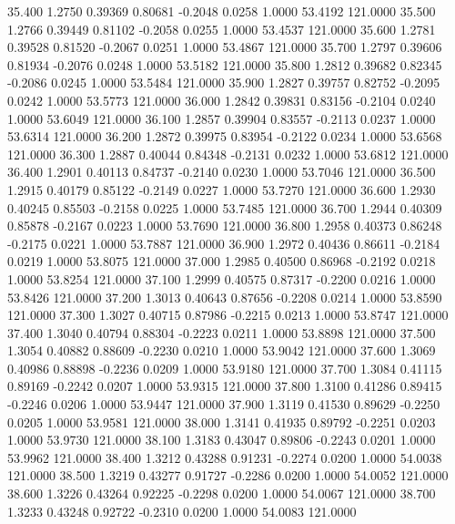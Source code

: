   35.400   1.2750   0.39369   0.80681  -0.2048   0.0258   1.0000  53.4192 121.0000
  35.500   1.2766   0.39449   0.81102  -0.2058   0.0255   1.0000  53.4537 121.0000
  35.600   1.2781   0.39528   0.81520  -0.2067   0.0251   1.0000  53.4867 121.0000
  35.700   1.2797   0.39606   0.81934  -0.2076   0.0248   1.0000  53.5182 121.0000
  35.800   1.2812   0.39682   0.82345  -0.2086   0.0245   1.0000  53.5484 121.0000
  35.900   1.2827   0.39757   0.82752  -0.2095   0.0242   1.0000  53.5773 121.0000
  36.000   1.2842   0.39831   0.83156  -0.2104   0.0240   1.0000  53.6049 121.0000
  36.100   1.2857   0.39904   0.83557  -0.2113   0.0237   1.0000  53.6314 121.0000
  36.200   1.2872   0.39975   0.83954  -0.2122   0.0234   1.0000  53.6568 121.0000
  36.300   1.2887   0.40044   0.84348  -0.2131   0.0232   1.0000  53.6812 121.0000
  36.400   1.2901   0.40113   0.84737  -0.2140   0.0230   1.0000  53.7046 121.0000
  36.500   1.2915   0.40179   0.85122  -0.2149   0.0227   1.0000  53.7270 121.0000
  36.600   1.2930   0.40245   0.85503  -0.2158   0.0225   1.0000  53.7485 121.0000
  36.700   1.2944   0.40309   0.85878  -0.2167   0.0223   1.0000  53.7690 121.0000
  36.800   1.2958   0.40373   0.86248  -0.2175   0.0221   1.0000  53.7887 121.0000
  36.900   1.2972   0.40436   0.86611  -0.2184   0.0219   1.0000  53.8075 121.0000
  37.000   1.2985   0.40500   0.86968  -0.2192   0.0218   1.0000  53.8254 121.0000
  37.100   1.2999   0.40575   0.87317  -0.2200   0.0216   1.0000  53.8426 121.0000
  37.200   1.3013   0.40643   0.87656  -0.2208   0.0214   1.0000  53.8590 121.0000
  37.300   1.3027   0.40715   0.87986  -0.2215   0.0213   1.0000  53.8747 121.0000
  37.400   1.3040   0.40794   0.88304  -0.2223   0.0211   1.0000  53.8898 121.0000
  37.500   1.3054   0.40882   0.88609  -0.2230   0.0210   1.0000  53.9042 121.0000
  37.600   1.3069   0.40986   0.88898  -0.2236   0.0209   1.0000  53.9180 121.0000
  37.700   1.3084   0.41115   0.89169  -0.2242   0.0207   1.0000  53.9315 121.0000
  37.800   1.3100   0.41286   0.89415  -0.2246   0.0206   1.0000  53.9447 121.0000
  37.900   1.3119   0.41530   0.89629  -0.2250   0.0205   1.0000  53.9581 121.0000
  38.000   1.3141   0.41935   0.89792  -0.2251   0.0203   1.0000  53.9730 121.0000
  38.100   1.3183   0.43047   0.89806  -0.2243   0.0201   1.0000  53.9962 121.0000
  38.400   1.3212   0.43288   0.91231  -0.2274   0.0200   1.0000  54.0038 121.0000
  38.500   1.3219   0.43277   0.91727  -0.2286   0.0200   1.0000  54.0052 121.0000
  38.600   1.3226   0.43264   0.92225  -0.2298   0.0200   1.0000  54.0067 121.0000
  38.700   1.3233   0.43248   0.92722  -0.2310   0.0200   1.0000  54.0083 121.0000
